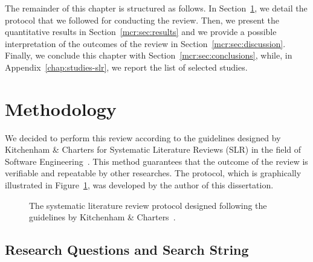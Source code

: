 The remainder of this chapter is structured as follows. In Section~\ref{mcr:sec:methodology}, we detail the protocol that we followed for conducting the review. Then, we present the quantitative results in Section~\ref{mcr:sec:results} and we provide a possible interpretation of the outcomes of the review in Section~\ref{mcr:sec:discussion}. Finally, we conclude this chapter with Section~\ref{mcr:sec:conclusions}, while, in Appendix~\ref{chap:studies-slr}, we report the list of selected studies.

\section{Methodology}
\label{mcr:sec:methodology}

We decided to perform this review according to the guidelines designed by Kitchenham \& Charters for Systematic Literature Reviews (SLR) in the field of Software Engineering~\cite{Kitchenham07}. This method guarantees that the outcome of the review is verifiable and repeatable by other researches. The protocol, which is graphically illustrated in Figure~\ref{mcr:fig:protocol}, was developed by the author of this dissertation.

\begin{figure}
\centering
{}
\caption[Systematic literature review protocol]{The systematic literature review protocol designed following the guidelines by Kitchenham \& Charters~\cite{Kitchenham07}.}
\label{mcr:fig:protocol}
\end{figure}

\subsection{Research Questions and Search String}
\label{mcr:sec:questions}


